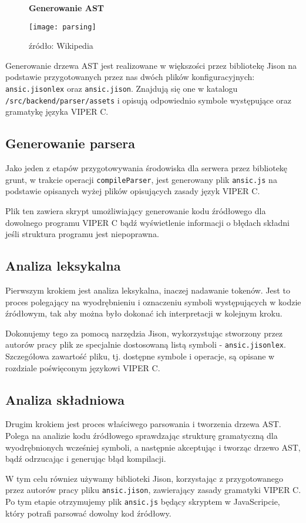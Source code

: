 \documentclass[a4paper,twoside,openright,11pt]{report}
\begin{document}
\begin{figure}[H]
  \centering
  \textbf{Generowanie AST}\par\medskip
  \texttt{[image: parsing]}
  \caption{źródło: Wikipedia}
\end{figure}


\par Generowanie drzewa AST jest realizowane w większości przez bibliotekę Jison na podstawie przygotowanych przez nas dwóch plików konfiguracyjnych: \texttt{ansic.jisonlex} oraz \texttt{ansic.jison}. Znajdują się one w katalogu \texttt{/src/backend/parser/assets} i opisują odpowiednio symbole występujące oraz gramatykę języka VIPER C.

  \subsection {Generowanie parsera}
\par Jako jeden z etapów przygotowywania środowiska dla serwera przez bibliotekę grunt, w trakcie operacji \texttt{compileParser}, jest generowany plik \texttt{ansic.js} na podstawie opisanych wyżej plików opisujących zasady język VIPER C. 
\par Plik ten zawiera skrypt umożliwiający generowanie kodu źródłowego dla dowolnego programu VIPER C bądź wyświetlenie informacji o błędach składni jeśli struktura programu jest niepoprawna. 

  \subsection {Analiza leksykalna}
\par Pierwszym krokiem jest analiza leksykalna, inaczej nadawanie tokenów. Jest to proces polegający na wyodrębnieniu i oznaczeniu symboli występujących w kodzie źródłowym, tak aby można było dokonać ich interpretacji w kolejnym kroku. 
\par Dokonujemy tego za pomocą narzędzia Jison, wykorzystując stworzony przez autorów pracy plik ze specjalnie dostosowaną listą symboli - \texttt{ansic.jisonlex}. Szczegółowa zawartość pliku, tj. dostępne symbole i operacje, są opisane w rozdziale poświęconym językowi VIPER C.

  \subsection {Analiza składniowa}
\par Drugim krokiem jest proces właściwego parsowania i tworzenia drzewa AST. Polega na analizie kodu źródłowego sprawdzając strukturę gramatyczną dla wyodrębnionych wcześniej symboli, a następnie akceptując i tworząc drzewo AST, bądź odrzucając i generując błąd kompilacji. \cite{ansk} 
\par W tym celu równiez używamy biblioteki Jison, korzystając z przygotowanego przez autorów pracy pliku \texttt{ansic.jison}, zawierający zasady gramatyki VIPER C. Po tym etapie otrzymujemy plik \texttt{ansic.js} będący skryptem w JavaScripcie, który potrafi parsować dowolny kod źródłowy.
\end{document}
